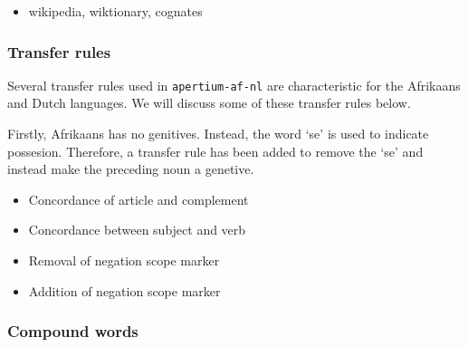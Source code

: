 \documentclass[11pt]{article}
\begin{document}
\begin{itemize}
\item wikipedia, wiktionary, cognates
\end{itemize}

\subsubsection{Transfer rules}


Several transfer rules used in {\small {\tt apertium-af-nl}}  are characteristic for the
Afrikaans and Dutch languages. We will discuss some of these transfer rules below.

Firstly, Afrikaans has no genitives. Instead, the word `se' is used to indicate possesion. 
Therefore, a transfer rule has been added to remove the `se' and instead make the preceding
noun a genetive.


\begin{itemize}
\item Concordance of article and complement
\item Concordance between subject and verb
\item Removal of negation scope marker
\end{itemize}

\begin{itemize}
\item Addition of negation scope marker
\end{itemize}


\subsubsection{Compound words}

\end{document}
